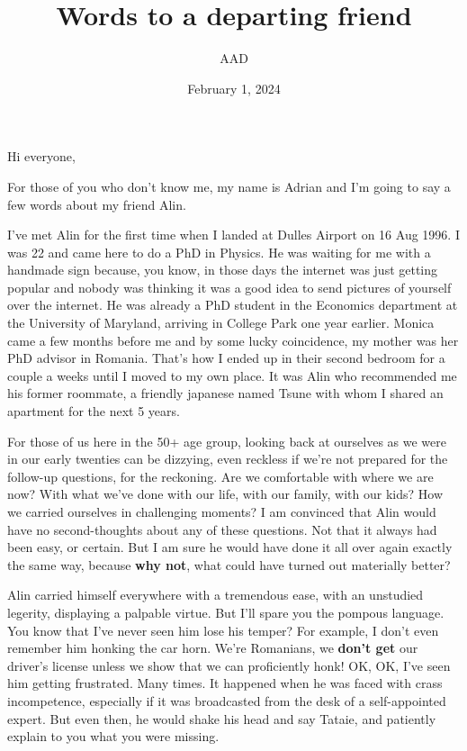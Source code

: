 \documentclass[12pt]{article}
\begin{document}
\large
\title{Words to a departing friend}
\author{AAD}
\date{February 1, 2024}
\maketitle

Hi everyone,

\bigskip
For those of you who don't know me, my name is Adrian and I'm going 
to say a few words about my friend Alin.  


\bigskip
I've met Alin for the first time when I landed at Dulles Airport on 
16 Aug 1996.  I was 22 and came here to do a PhD in Physics.  He was 
waiting for me with a handmade sign because, you know, in those days 
the internet was just getting popular and nobody was thinking it 
was a good idea to send pictures of yourself over the internet.  
He was already a PhD student in the Economics 
department at the University of Maryland, arriving in College Park one 
year earlier.  Monica came a few months before me and by some lucky 
coincidence, my mother was her PhD advisor in Romania.  That's how I 
ended up in their second bedroom for a couple a weeks until I moved 
to my own place.  It was Alin who recommended me his former roommate, 
a friendly japanese named Tsune with whom I shared an apartment for 
the next 5 years. 

\bigskip
For those of us here in the 50+ age group, looking back at ourselves 
as we were in our early twenties can be dizzying, even reckless if 
we're not prepared for the follow-up questions, for the reckoning.  
Are we comfortable with where we are now?  With what we've done with 
our life, with our family, with our kids?  How we carried ourselves 
in challenging moments?  I am convinced that Alin would have no 
second-thoughts about any of these questions.  Not that it always 
had been easy, or certain.  But I am sure he would have done it 
all over again exactly the same way, because {\bf why not}, what 
could have turned out materially better?  

\bigskip
Alin carried himself everywhere with a tremendous ease, with an 
unstudied legerity, displaying a palpable virtue.  But I'll 
spare you the pompous language.  You know that I've never seen him 
lose his temper?  For example, I don't even remember 
him honking the car horn.  We're Romanians, we {\bf don't get} our 
driver's license unless we show that we can proficiently honk!  
OK, OK, I've seen him getting frustrated.  Many times.  It happened 
when he was faced with crass incompetence, especially if it was 
broadcasted from the desk of a self-appointed expert.  But even 
then, he would shake his head and say Tataie, and patiently explain 
to you what you were missing.    
\end{document}
